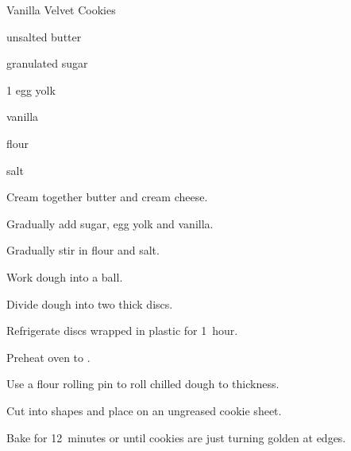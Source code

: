 \begin{recipe}{Vanilla Velvet Cookies}{}{}

\begin{ingredients}
\item {} unsalted butter
\item {} 
\item {} granulated sugar
\item 1 egg yolk
\item {} vanilla
\item \C{2 \half} flour
\item salt
\end{ingredients}

\begin{directions}
\item Cream together butter and cream cheese.
\item Gradually add sugar, egg yolk and vanilla.
\item Gradually stir in flour and salt.
\item Work dough into a ball.
\item Divide dough into two thick discs.
\item Refrigerate discs wrapped in plastic for 1~hour.
\item Preheat oven to .
\item Use a flour rolling pin to roll chilled dough to \cm{\half} thickness.
\item Cut into shapes and place on an ungreased cookie sheet.
\item Bake for 12~minutes or until cookies are just turning golden at edges.
\end{directions}

\end{recipe}
